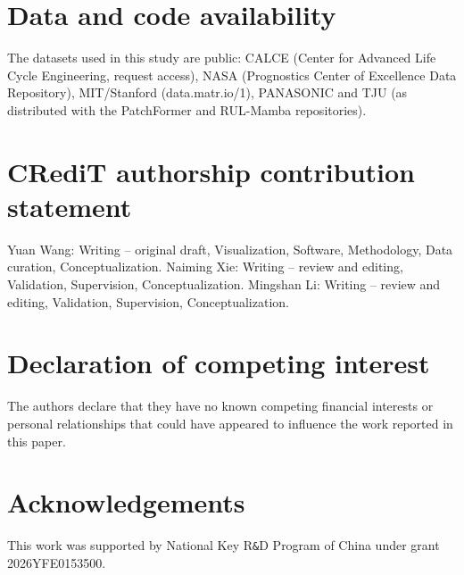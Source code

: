 \documentclass[final,5p,times,twocolumn]{elsarticle}
\begin{document}







\section*{Data and code availability}

The datasets used in this study are public: CALCE (Center for
Advanced Life Cycle Engineering, request access), NASA (Prognostics
Center of Excellence Data Repository), MIT/Stanford
(data.matr.io/1), PANASONIC and TJU (as distributed with the
PatchFormer and RUL-Mamba repositories). 

\section*{CRediT authorship contribution statement}

Yuan Wang: Writing -- original draft, Visualization, Software,
Methodology, Data curation, Conceptualization. Naiming Xie: Writing --
review and editing, Validation, Supervision, Conceptualization. Mingshan
Li: Writing -- review and editing, Validation, Supervision,
Conceptualization.

\section*{Declaration of competing interest}

The authors declare that they have no known competing financial
interests or personal relationships that could have appeared to
influence the work reported in this paper.

\section*{Acknowledgements}

This work was supported by National Key R\verb|&|D Program of China under grant 2026YFE0153500.



\end{document}
